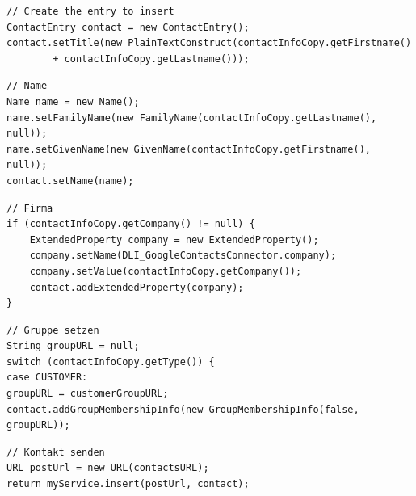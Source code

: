 \begin{lstlisting}
// Create the entry to insert
ContactEntry contact = new ContactEntry();
contact.setTitle(new PlainTextConstruct(contactInfoCopy.getFirstname()
		+ contactInfoCopy.getLastname()));
\end{lstlisting}

\begin{lstlisting}
// Name
Name name = new Name();
name.setFamilyName(new FamilyName(contactInfoCopy.getLastname(), null));
name.setGivenName(new GivenName(contactInfoCopy.getFirstname(), null));
contact.setName(name);
\end{lstlisting}

\begin{lstlisting}	
// Firma
if (contactInfoCopy.getCompany() != null) {
	ExtendedProperty company = new ExtendedProperty();
	company.setName(DLI_GoogleContactsConnector.company);
	company.setValue(contactInfoCopy.getCompany());
	contact.addExtendedProperty(company);
}
\end{lstlisting}

\begin{lstlisting}
// Gruppe setzen
String groupURL = null;
switch (contactInfoCopy.getType()) {
case CUSTOMER:
groupURL = customerGroupURL;
contact.addGroupMembershipInfo(new GroupMembershipInfo(false, groupURL));
\end{lstlisting}

\begin{lstlisting}
// Kontakt senden		
URL postUrl = new URL(contactsURL);
return myService.insert(postUrl, contact);
\end{lstlisting}